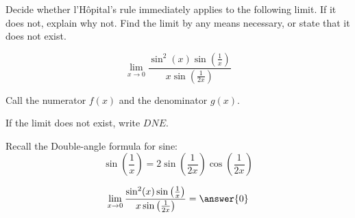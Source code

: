 \documentclass{ximera}
\author{Steven Gubkin\and Nela Lakos}
\begin{document}
\begin{exercise}

Decide whether l'H\^{o}pital's rule immediately applies to the following limit.  If it does not, explain why not.  Find the limit by any means necessary, or state that it does not exist. 

\[
\lim_{x \to 0} \frac{\sin^2(x)\sin(\frac{1}{x})}{x\sin(\frac{1}{2x})}
\]

\begin{prompt}
	Call the numerator $f(x)$ and the denominator $g(x)$. 

	\begin{multipleChoice}
\end{multipleChoice}

If the limit does not exist, write $DNE$.


\begin{hint}
Recall the Double-angle formula for sine:
\[
\sin{\left(\frac{1}{x}\right)}=2\sin{\left(\frac{1}{2x}\right)}\cos{\left(\frac{1}{2x}\right)}
\]
\end{hint}


\[
\lim_{x \to 0} \frac{\sin^2(x)\sin\left(\frac{1}{x}\right)}{x\sin\left(\frac{1}{2x}\right)} = \answer{0}
\]

\end{prompt}

\end{exercise}
\end{document}
